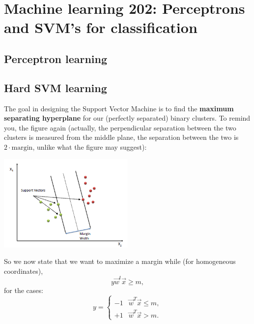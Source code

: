 \documentclass{article}
\begin{document}
\newpage
\section{Machine learning 202: Perceptrons and SVM's for classification}
\subsection{Perceptron learning}

\subsection{Hard SVM learning}
The goal in designing the Support Vector Machine is to find the \textbf{maximum separating hyperplane} for our (perfectly separated) binary clusters. To remind you, the figure again (actually, the perpendicular separation between the two clusters is measured from the middle plane, the separation between the two is $2\cdot\text{margin}$, unlike what the figure may suggest):
\begin{center}\includegraphics[width=0.5\textwidth]{SVM.png}\end{center}

So we now state that we want to maximize a margin while (for homogeneous coordinates),
\begin{equation}
    y\vec{w}^t\vec{x} \geq m,
\end{equation}
for the cases:
\begin{equation}
    y = \begin{cases} -1 &\vec{w}^T\vec{x}\leq m,\\
                      +1 &\vec{w}^T\vec{x}>m.\end{cases}
\end{equation}
\end{document}
